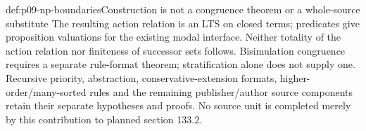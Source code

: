 \begin{proofboundary}{def:p09-np-boundaries}{Construction is not a congruence theorem or a whole-source substitute}
The resulting action relation is an LTS on closed terms; predicates
give proposition valuations for the existing modal interface.
Neither totality of the action relation nor finiteness of successor
sets follows. Bisimulation congruence requires a separate rule-format
theorem; stratification alone does not supply one. Recursive priority,
abstraction, conservative-extension formats, higher-order/many-sorted
rules and the remaining publisher/author source components retain
their separate hypotheses and proofs. No source unit is completed
merely by this contribution to planned section 133.2.
\end{proofboundary}

